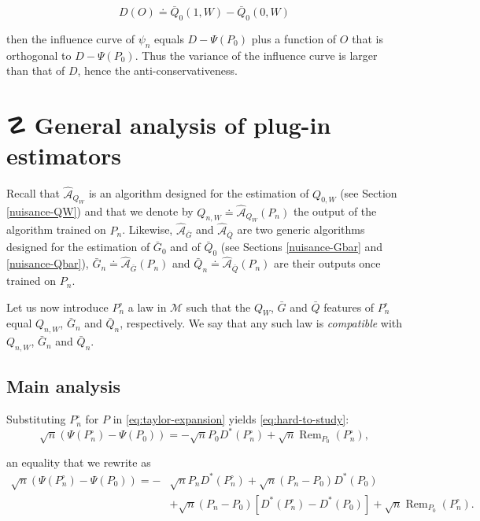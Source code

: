 \documentclass[11pt,openright,twoside]{book}
\DeclareMathOperator{\Rem}{Rem}
\DeclareRobustCommand{\stixdanger}{%
  {\usefont{U}{stixbbit}{m}{it}\symbol{"F6}}%
}
\newcommand{\Algo}{\widehat{\mathcal{A}}}
\newcommand{\defq}{\doteq}
\newcommand{\calM}{\mathcal{M}}
\newcommand{\Gbar}{\bar{G}}
\newcommand{\Phat}{P^{\circ}}
\newcommand{\Qbar}{\bar{Q}}
\theoremstyle{definition}
\theoremstyle{definition}
\theoremstyle{definition}
\theoremstyle{remark}
\begin{document}
\begin{equation*}
D(O) \defq \Qbar_{0}(1,W) - \Qbar_{0}(0,W)
\end{equation*}

then the influence curve of \(\psi_{n}\) equals \(D - \Psi(P_{0})\) plus a
function of \(O\) that is orthogonal to \(D - \Psi(P_{0})\). Thus the variance of
the influence curve is larger than that of \(D\), hence the
anti-conservativeness.

\hypertarget{app-analysis-of-plug-in}{%
\section{\texorpdfstring{☡ \stixdanger{} General analysis of plug-in estimators}{☡  General analysis of plug-in estimators}}\label{app-analysis-of-plug-in}}

Recall that \(\Algo_{Q_{W}}\) is an algorithm designed for the estimation of
\(Q_{0,W}\) (see Section \ref{nuisance-QW}) and that we denote by \(Q_{n,W} \defq \Algo_{Q_{W}}(P_{n})\) the output of the algorithm trained on \(P_{n}\).
Likewise, \(\Algo_{\Gbar}\) and \(\Algo_{\Qbar}\) are two generic algorithms
designed for the estimation of \(\Gbar_{0}\) and of \(\Qbar_{0}\) (see Sections
\ref{nuisance-Gbar} and \ref{nuisance-Qbar}), \(\Gbar_{n} \defq \Algo_{\Gbar}(P_{n})\) and \(\Qbar_{n} \defq \Algo_{\Qbar}(P_{n})\) are their
outputs once trained on \(P_{n}\).

Let us now introduce \(\Phat_n\) a law in \(\calM\) such that the \(Q_{W}\), \(\Gbar\)
and \(\Qbar\) features of \(\Phat_n\) equal \(Q_{n,W}\), \(\Gbar_{n}\) and
\(\Qbar_{n}\), respectively. We say that any such law is \emph{compatible} with
\(Q_{n,W}\), \(\Gbar_n\) and \(\Qbar_n\).

\hypertarget{app-analysis-of-plug-in-main}{%
\subsection{Main analysis}\label{app-analysis-of-plug-in-main}}

Substituting \(\Phat_n\) for \(P\) in \eqref{eq:taylor-expansion} yields
\eqref{eq:hard-to-study}:
\begin{equation} 
\sqrt{n} (\Psi(\Phat_n) - \Psi(P_0)) =  - \sqrt{n} P_0 D^*(\Phat_n) + \sqrt{n}
\Rem_{P_0}(\Phat_n), 
\end{equation}

an equality that we rewrite as
\begin{align} 
\sqrt{n} (\Psi(\Phat_n) - \Psi(P_0)) = - & \sqrt{n} P_n D^*(\Phat_n) + \sqrt{n}
(P_n - P_0) D^*(P_0)\\ & + \sqrt{n}(P_n - P_0) [D^*(\Phat_n) - D^*(P_0)] +
\sqrt{n}\Rem_{P_0}(\Phat_n). 
\end{align}
\end{document}
